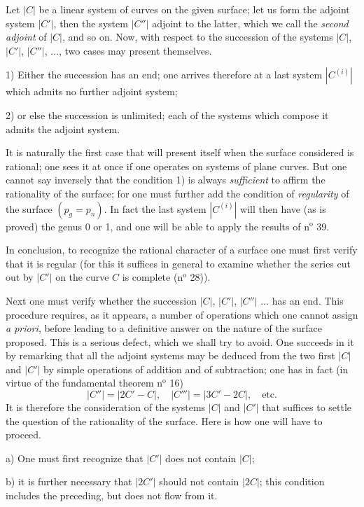 \documentclass{article}
\begin{document}
Let $|C|$ be a linear system of curves on the given surface; let us form the adjoint system $|C'|$, then the system $|C''|$ adjoint to the latter, which we call the \emph{second adjoint} of $|C|$, and so on. Now, with respect to the succession of the systems $|C|$, $|C'|$, $|C''|$, $\ldots$, two cases may present themselves.

1) Either the succession has an end; one arrives therefore at a last system $|C^{(i)}|$ which admits no further adjoint system;

2) or else the succession is unlimited; each of the systems which compose it admits the adjoint system.

It is naturally the first case that will present itself when the surface considered is rational; one sees it at once if one operates on systems of plane curves. But one cannot say inversely that the condition 1) is always \emph{sufficient} to affirm the rationality of the surface; for one must further add the condition of \emph{regularity} of the surface $(p_{g} = p_{n})$. In fact the last system $|C^{(i)}|$ will then have (as is proved) the genus 0 or 1, and one will be able to apply the results of n${}^{\text{o}}$ 39.

In conclusion, to recognize the rational character of a surface one must first verify that it is regular (for this it suffices in general to examine whether the series cut out by $|C'|$ on the curve $C$ is complete (n${}^{\text{o}}$ 28)).

Next one must verify whether the succession $|C|$, $|C'|$, $|C''|$ $\ldots$ has an end. This procedure requires, as it appears, a number of operations which one cannot assign \emph{a priori}, before leading to a definitive answer on the nature of the surface proposed. This is a serious defect, which we shall try to avoid. One succeeds in it by remarking that all the adjoint systems may be deduced from the two first $|C|$ and $|C'|$ by simple operations of addition and of subtraction; one has in fact (in virtue of the fundamental theorem n${}^{\text{o}}$ 16)
\[ |C''| = |2C' - C|, \quad |C'''| = |3C' - 2C|, \quad \text{etc.} \]
It is therefore the consideration of the systems $|C|$ and $|C'|$ that suffices to settle the question of the rationality of the surface. Here is how one will have to proceed.

a) One must first recognize that $|C'|$ does not contain $|C|$;


b) it is further necessary that $|2C'|$ should not contain $|2C|$; this condition includes the preceding, but does not flow from it.
\end{document}
